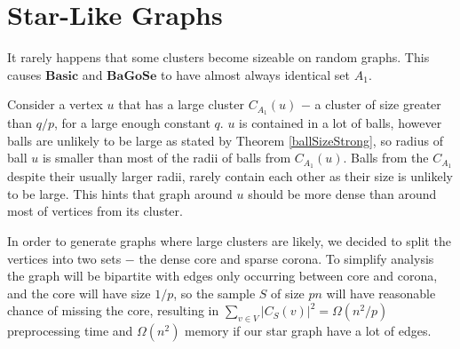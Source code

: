 \documentclass[shortabstract, lic, english]{iithesis}
\theoremstyle{definition} \newtheorem{definition}{Definition}[chapter]
\theoremstyle{plain} \newtheorem{remark}[definition]{Observation}
\theoremstyle{plain} \newtheorem{theorem}[definition]{Theorem}
\theoremstyle{plain} \newtheorem{lemma}[definition]{Lemma}
\theoremstyle{plain} \newtheorem{conjecture}[definition]{Conjecture}
\begin{document}
\section{Star-Like Graphs}

It rarely happens that some clusters become sizeable on random graphs.
This causes $\mathbf{Basic}$ and $\mathbf{BaGoSe}$ to have almost always identical set $A_1$.

Consider a vertex $u$ that has a large cluster $C_{A_1}(u)$ $-$ a cluster of size greater than $q/p$, for a large enough constant $q$.
$u$ is contained in a lot of balls, however balls are unlikely to be large as stated by Theorem \ref{ballSizeStrong},
so radius of ball $u$ is smaller than most of the radii of balls from $C_{A_1}(u)$. Balls from the $C_{A_1}$ despite their usually larger radii,
rarely contain each other as their size is unlikely to be large. This hints that graph around $u$ should be more dense than around most of vertices from its cluster.

In order to generate graphs where large clusters are likely, we decided to split the vertices into two sets $-$ the dense core and sparse corona.
To simplify analysis the graph will be bipartite with edges only occurring between core and corona,
and the core will have size $1/p$, so the sample $S$ of size $p  n$ will have reasonable chance of missing the core,
resulting in $\sum_{v \in V}|C_S(v)|^2 = \Omega(n^2/p)$ preprocessing time and $\Omega(n^2)$ memory if our star graph have a lot of edges.
\end{document}
